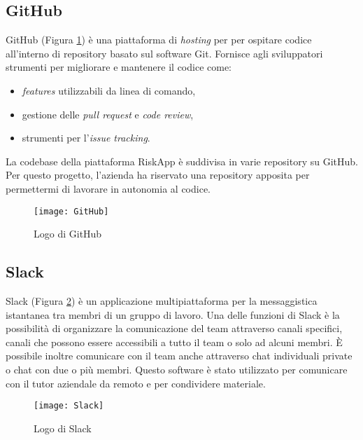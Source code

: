 \subsection{GitHub}
GitHub (Figura \ref{fig:github}) è una piattaforma di \emph{hosting} per per ospitare codice all'interno di repository basato sul software Git.\newline
Fornisce agli sviluppatori strumenti per migliorare e mantenere il codice come:
\begin{itemize}
    \item \emph{features} utilizzabili da linea di comando,
    \item gestione delle \emph{pull request} e \emph{code review},
    \item strumenti per l’\emph{issue tracking}.
\end{itemize}
La codebase della piattaforma RiskApp è suddivisa in varie repository su GitHub.\newline
Per questo progetto, l'azienda ha riservato una repository apposita per permettermi di lavorare in autonomia al codice.\newline
\begin{figure}[!h] 
    \centering 
    \texttt{[image: GitHub]} 
    \caption{Logo di GitHub}\label{fig:github}
\end{figure}

\newpage

\subsection{Slack}
Slack (Figura \ref{fig:slack}) è un applicazione multipiattaforma per la messaggistica istantanea tra membri di un gruppo di lavoro.\newline
Una delle funzioni di Slack è la possibilità di organizzare la comunicazione del team attraverso canali specifici, canali che possono essere accessibili a tutto il team o solo ad alcuni membri.\newline
È possibile inoltre comunicare con il team anche attraverso chat individuali private o chat con due o più membri.\newline
Questo software è stato utilizzato per comunicare con il tutor aziendale da remoto e per condividere materiale.\newline
\begin{figure}[!h] 
    \centering 
    \texttt{[image: Slack]} 
    \caption{Logo di Slack}\label{fig:slack}
\end{figure}

